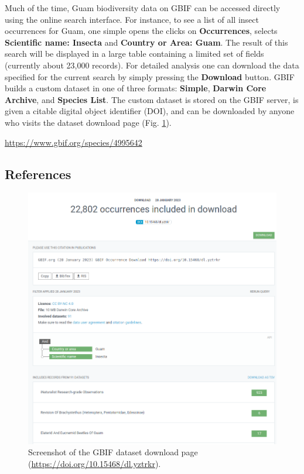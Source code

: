 \documentclass[12pt,letterpaper,english,bibliography=totocnumbered, abstract=on]{scrartcl}
\begin{document}
Much of the time, Guam biodiversity data on GBIF can be accessed directly using the online search interface. For instance, to see a list of all insect occurrences for Guam, one simple opens the clicks on \textbf{Occurrences}, selects \textbf{Scientific name: Insecta} and \textbf{Country or Area: Guam}. The result of this search will be displayed in a large table containing a limited set of fields (currently about 23,000 records). For detailed analysis one can download the data specified for the current search by simply pressing the \textbf{Download} button. GBIF builds a custom dataset in one of three formats: \textbf{Simple}, \textbf{Darwin Core Archive}, and \textbf{Species List}. The custom dataset is stored on the GBIF server, is given a citable digital object identifier (DOI), and can be downloaded by anyone who visits the dataset download page \cite{https://doi.org/10.15468/dl.yztrkr} (Fig. \ref*{fig:dataset-download}).

\url{https://www.gbif.org/species/4995642}

\subsection{References}
\printbibliography[heading=none]









\begin{figure}[h]
	\centering
	\includegraphics[width=\linewidth]{images/dataset-download}
	\caption{Screenshot of the GBIF dataset download page (\url{https://doi.org/10.15468/dl.yztrkr}).}
	\label{fig:dataset-download}
\end{figure}
\end{document}
